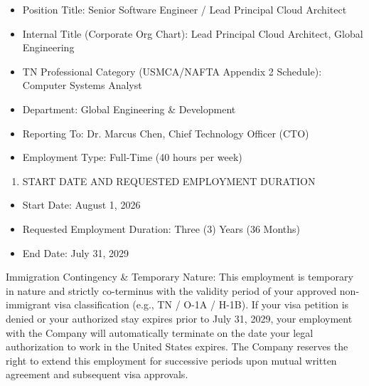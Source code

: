 \begin{itemize}

\item Position Title: Senior Software Engineer / Lead Principal Cloud Architect

\item Internal Title (Corporate Org Chart): Lead Principal Cloud Architect, Global Engineering

\item TN Professional Category (USMCA/NAFTA Appendix 2 Schedule): Computer Systems Analyst

\item Department: Global Engineering \& Development

\item Reporting To: Dr. Marcus Chen, Chief Technology Officer (CTO)

\item Employment Type: Full-Time (40 hours per week)

\end{itemize}

\begin{enumerate}

\item START DATE AND REQUESTED EMPLOYMENT DURATION

\end{enumerate}

\begin{itemize}

\item Start Date: August 1, 2026

\item Requested Employment Duration: Three (3) Years (36 Months)

\item End Date: July 31, 2029

\end{itemize}

Immigration Contingency \& Temporary Nature: This employment is temporary in nature and strictly co-terminus with the validity period of your approved non-immigrant visa classification (e.g., TN / O-1A / H-1B). If your visa petition is denied or your authorized stay expires prior to July 31, 2029, your employment with the Company will automatically terminate on the date your legal authorization to work in the United States expires. The Company reserves the right to extend this employment for successive periods upon mutual written agreement and subsequent visa approvals.


